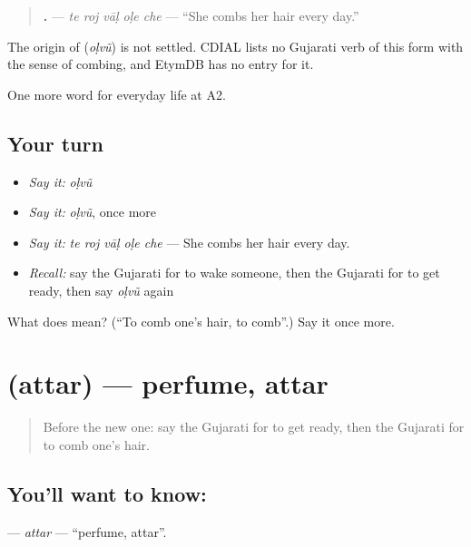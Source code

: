 \begin{quote}
\textbf{    .} — \emph{te roj vāḷ oḷe che} — \textquotedblleft{}She combs her hair every day.\textquotedblright{}
\end{quote}

\begin{cousinweb}
The origin of \textbf{} (\emph{oḷvũ}) is not settled. CDIAL lists no Gujarati verb of this form with the sense of combing, and EtymDB has no entry for it.
\end{cousinweb}

\begin{grammarlens}[title={What you've built}]
One more word for everyday life at A2.
\end{grammarlens}

\subsection*{Your turn}
\begin{itemize}
\raggedright
  \item \emph{Say it:} \emph{oḷvũ}
  \item \emph{Say it:} \emph{oḷvũ}, once more
  \item \emph{Say it:} \emph{te roj vāḷ oḷe che} — She combs her hair every day.
  \item \emph{Recall:} say the Gujarati for to wake someone, then the Gujarati for to get ready, then say \emph{oḷvũ} again
\end{itemize}

\begin{tcolorbox}[breakable,colback=teal!4,colframe=teal!35!black,title={Before you move on}]
What does  mean? (\textquotedblleft{}To comb one's hair, to comb\textquotedblright{}.) Say it once more.
\end{tcolorbox}
\section[\texorpdfstring{\gu{અત્તર} (attar)}{અત્તર (attar)}]{ (attar) — perfume, attar}

\label{lesson:GU-C155-attar}



\begin{quote}
Before the new one: say the Gujarati for to get ready, then the Gujarati for to comb one's hair.
\end{quote}

\subsection*{You'll want to know: }
\textbf{} — \emph{attar} — \textquotedblleft{}perfume, attar\textquotedblright{}.

